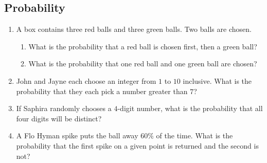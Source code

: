 \documentclass[twocolumn]{article}
\begin{document}
\subsection*{Probability}
\begin{enumerate}[resume]
	\item A box contains three red balls and three green balls. Two balls
		are chosen.
		\begin{enumerate}
			\item What is the probability that a red ball is chosen first,
				then a green ball?
				\vspace{3cm}
			\item What is the probability that one red ball and one green
				ball are chosen?
				\vspace{3cm}
		\end{enumerate}
	\item John and Jayne each choose an integer from $1$ to $10$ inclusive.
		What is the probability that they each pick a number greater than
		$7$?
		\vspace{3cm}
	\item If Saphira randomly chooses a $4$-digit number, what is the
		probability that all four digits will be distinct?
		\vspace{3cm}
	\item A Flo Hyman spike puts the ball away $60\%$ of the time. What is
		the probability that the first spike on a given point is returned
		and the second is not?
		\vspace{3cm}
\end{enumerate}
\end{document}
